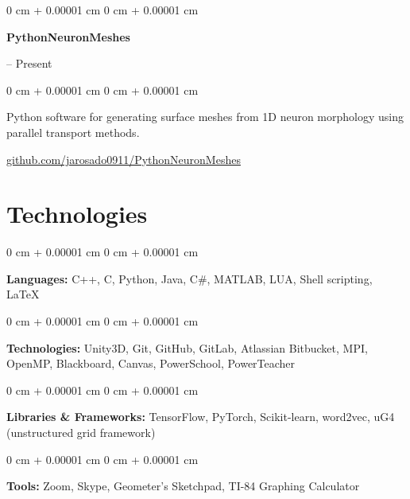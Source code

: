 \documentclass[10pt, letterpaper]{article}
\newenvironment{onecolentry}{
    \begin{adjustwidth}{
        0 cm + 0.00001 cm
    }{
        0 cm + 0.00001 cm
    }
}{
    \end{adjustwidth}
} %
\newenvironment{twocolentry}[2][]{
    \onecolentry
    \def\secondColumn{#2}
    \setcolumnwidth{\fill, 4.5 cm}
    \begin{paracol}{2}
}{
    \switchcolumn \raggedleft \secondColumn
    \end{paracol}
    \endonecolentry
} %
\begin{document}
\vspace{0.3 cm}

\begin{samepage}
    \begin{twocolentry}{
        2022 – Present
    }
        \textbf{PythonNeuronMeshes}
    \end{twocolentry}

    \vspace{0.10 cm}
    
    \begin{onecolentry}
        Python software for generating surface meshes from 1D neuron morphology using parallel transport methods.

        \vspace{0.10 cm}
        
        \href{https://github.com/jarosado0911/PythonNeuronMeshes}{github.com/jarosado0911/PythonNeuronMeshes}
    \end{onecolentry}
\end{samepage}


    
\section{Technologies}

\begin{onecolentry}
    \textbf{Languages:} C++, C, Python, Java, C\#, MATLAB, LUA, Shell scripting, LaTeX
\end{onecolentry}

\vspace{0.2 cm}

\begin{onecolentry}
    \textbf{Technologies:} Unity3D, Git, GitHub, GitLab, Atlassian Bitbucket, MPI, OpenMP, Blackboard, Canvas, PowerSchool, PowerTeacher
\end{onecolentry}

\vspace{0.2 cm}

\begin{onecolentry}
    \textbf{Libraries \& Frameworks:} TensorFlow, PyTorch, Scikit-learn, word2vec, uG4 (unstructured grid framework)
\end{onecolentry}

\vspace{0.2 cm}

\begin{onecolentry}
    \textbf{Tools:} Zoom, Skype, Geometer's Sketchpad, TI-84 Graphing Calculator
\end{onecolentry}
\end{document}
